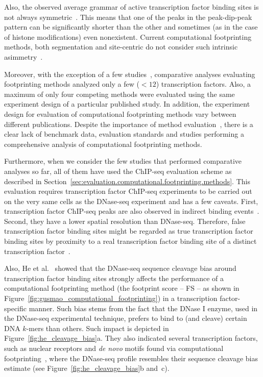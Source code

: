 Also, the observed average grammar of active transcription factor binding sites is not always symmetric~\cite{kundaje2012}. This means that one of the peaks in the peak-dip-peak pattern can be significantly shorter than the other and sometimes (as in the case of histone modifications) even nonexistent. Current computational footprinting methods, both segmentation and site-centric do not consider such intrinsic asimmetry~\cite{boyle2011,pique2011}.

Moreover, with the exception of a few studies~\cite{sherwood2014, yardimci2014, kahara2015}, comparative analyses evaluating footprinting methods analyzed only a few ($<12$) transcription factors. Also, a maximum of only four competing methods were evaluated using the same experiment design of a particular published study. In addition, the experiment design for evaluation of computational footprinting methods vary between different publications. Despite the importance of method evaluation~\cite{rusk2015}, there is a clear lack of benchmark data, evaluation standards and studies performing a comprehensive analysis of computational footprinting methods.

Furthermore, when we consider the few studies that performed comparative analyses so far, all of them have used the ChIP-seq evaluation scheme as described in Section~\ref{sec:evaluation.computational.footprinting.methods}. This evaluation requires transcription factor ChIP-seq experiments to be carried out on the very same cells as the DNase-seq experiment and has a few caveats. First, transcription factor ChIP-seq peaks are also observed in indirect binding events~\cite{yardimci2014}. Second, they have a lower spatial resolution than DNase-seq. Therefore, false transcription factor binding sites might be regarded as true transcription factor binding sites by proximity to a real transcription factor binding site of a distinct transcription factor~\cite{cuellar2012,yardimci2014}.

Also, He et al.~\cite{he2014} showed that the DNase-seq sequence cleavage bias around transcription factor binding sites strongly affects the performance of a computational footprinting method (the footprint score -- FS -- as shown in Figure~\ref{fig:gusmao_computational_footprinting}) in a transcription factor-specific manner. Such bias stems from the fact that the DNase I enzyme, used in the DNase-seq experimental technique, prefers to bind to (and cleave) certain DNA $k$-mers than others. Such impact is depicted in Figure~\ref{fig:he_cleavage_bias}a. They also indicated several transcription factors, such as nuclear receptors and \emph{de novo} motifs found via computational footprinting~\cite{neph2012a}, where the DNase-seq profile resembles their sequence cleavage bias estimate (see Figure~\ref{fig:he_cleavage_bias}b and~c).

